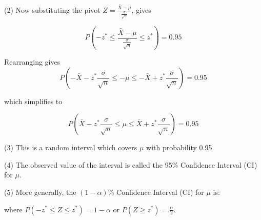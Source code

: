 \documentclass[t,xcolor=pdftex,dvipsnames,table]{beamer}\usepackage[]{graphicx}\usepackage[]{color}
\begin{document}
\begin{frame}[fragile]{}

(2) Now substituting the pivot 
$Z = \frac{ \bar{X} - \mu }{ \frac{\sigma}{\sqrt{n}} }$, gives

\[ P(-z^{*} \leq \frac{ \bar{X} - \mu }{ \frac{\sigma}{\sqrt{n}} } \leq z^{*}) = 0.95 \]

Rearranging gives
\[ P( -\bar{X} -z^{*} \frac{\sigma}{\sqrt{n}}  \leq        -\mu         \leq  -\bar{X} + z^{*} \frac{\sigma}{\sqrt{n}}) = 0.95 \]

which simplifies to

\[ P( \bar{X} -z^{*} \frac{\sigma}{\sqrt{n}}  \leq  \mu  \leq  \bar{X} + z^{*} \frac{\sigma}{\sqrt{n}}) = 0.95 \]
\end{frame}

\begin{frame}[fragile]{}
(3) This is a random interval which covers $\mu$ with probability 0.95. 

\vspace{.5cm}
\begin{center}
\end{center}



\vspace{.5cm}
(4) The observed value of the interval is called the 95\% Confidence Interval (CI) for $\mu$.

\vspace{.5cm}
\begin{center}
\end{center}

(5) More generally, the $(1-\alpha)$\% Confidence Interval (CI) for $\mu$ is:

\vspace{.5cm}
\begin{center}
\end{center}
where $P(-z^{*} \leq Z \leq z^{*}) = 1-\alpha$ or
$P(Z \geq z^{*}) = \frac{\alpha}{2}$.


\end{frame}
\end{document}
